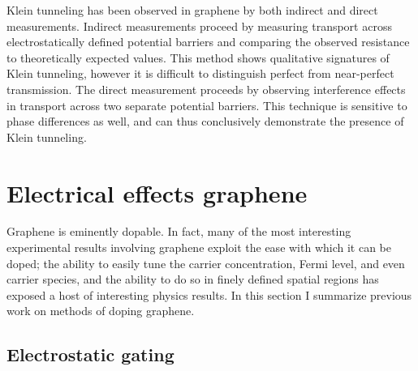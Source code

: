 \documentclass[edeposit,fullpage,draftthesis]{uiucthesis2009}
\begin{document}
        Klein tunneling has been observed in graphene
        by both indirect \cite{Huard2007, stander2009evidence} and direct \cite{young2009quantum} measurements. 
        Indirect measurements proceed by measuring transport across electrostatically 
        defined potential barriers and comparing
        the observed resistance to theoretically expected values. This method shows qualitative
        signatures of Klein tunneling, however it is difficult to distinguish perfect from near-perfect
        transmission. The direct measurement proceeds by observing interference effects in transport
        across two separate potential barriers. This technique is sensitive to phase differences as
        well, and can thus conclusively demonstrate the presence of Klein tunneling.
        
        
    \section{Electrical effects graphene}
    
        Graphene is eminently dopable. In fact, many of the most interesting experimental
        results involving graphene exploit the ease with which it can be doped; the 
        ability to easily tune the carrier concentration, Fermi level, and even carrier
        species, and the ability to do so in finely defined spatial regions has exposed
        a host of interesting physics results. In this section I summarize previous work
        on methods of doping graphene.
        
        \subsection{Electrostatic gating}
        \label{sec:bg:gating}
      
\end{document}
